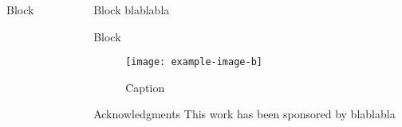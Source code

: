 \documentclass[final,hyperref={pdfpagelabels=false}]{beamer}
\begin{document}
\begin{frame}[t]
\begin{columns}[t]
\begin{column}{.465\textwidth}
\begin{block}{Block}
\begin{columns}
        \end{columns} %
      \end{block}



    \end{column} %

    \begin{column}{.03\textwidth}\end{column} %

    \begin{column}{.465\textwidth} %


      \begin{block}{Block}
        blablabla
      \end{block}


      \begin{block}{Block}
        \begin{figure}
          \texttt{[image: example-image-b]}%
          \vspace{-7mm}
          \caption{Caption}
          \label{fig:simu}
        \end{figure}
      \end{block}



      \begin{block}{Acknowledgments}
        \footnotesize%
        \noindent This work has been sponsored by blablabla
      \end{block}


\end{column}
\end{columns}
\end{frame}
\end{document}
